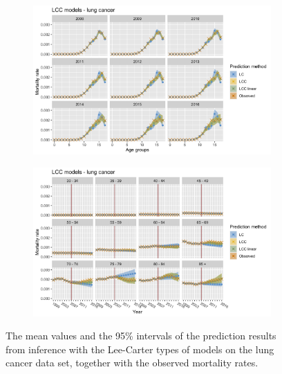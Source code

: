 \begin{figure}[h!]
    \centering
    \begin{subfigure}[b]{.6\linewidth}
        \includegraphics[width=\linewidth]{real-data/real-data-univariate/Figures/univariate-LCC-by-age-lung.png}
    \end{subfigure}
    
    \begin{subfigure}[b]{.6\linewidth}
        \includegraphics[width=\linewidth]{real-data/real-data-univariate/Figures/univariate-LCC-by-period-lung.png}
    \end{subfigure}
    \caption{The mean values and the 95\% intervals of the prediction results from inference with the Lee-Carter types of models on the lung cancer data set, together with the observed mortality rates. }
    \label{fig:uv-LCC-lung}
\end{figure}

